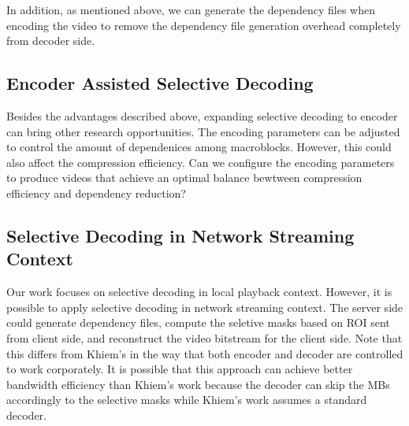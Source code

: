 In addition, as mentioned above, we can generate the dependency files when encoding the video to remove the dependency file generation overhead completely from decoder side. 

\subsection{Encoder Assisted Selective Decoding}
Besides the advantages described above, expanding selective decoding to encoder can bring other research opportunities. The encoding parameters can be adjusted to control the amount of dependenices among macroblocks. However, this could also affect the compression efficiency. Can we configure the encoding parameters to produce videos that achieve an optimal balance bewtween compression efficiency and dependency reduction? 

\subsection{Selective Decoding in Network Streaming Context}
Our work focuses on selective decoding in local playback context. However, it is possible to apply selective decoding in network streaming context. The server side could generate dependency files, compute the seletive masks based on ROI sent from client side, and reconstruct the video bitstream for the client side. Note that this differs from Khiem's \cite{Ngo:2011:AEZ:1943552.1943581} in the way that both encoder and decoder are controlled to work corporately. It is possible that this approach can achieve better bandwidth efficiency than Khiem's work because the decoder can skip the MBs accordingly to the selective masks while Khiem's work assumes a standard decoder.  


